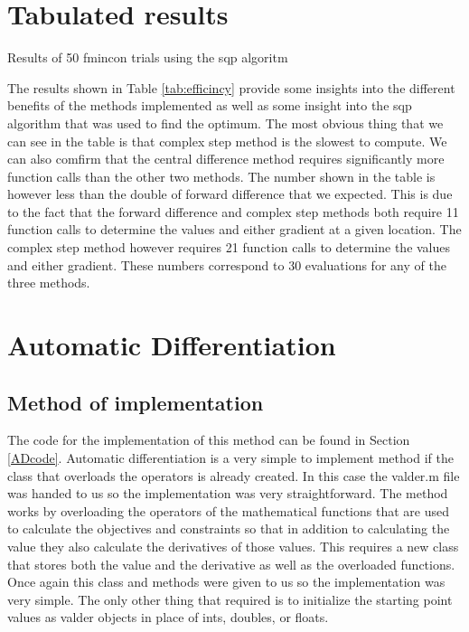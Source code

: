 \documentclass{article}
\begin{document}
\section{Tabulated results}
\begin{table}[H]
	\caption{Results of 50 fmincon trials using the sqp algoritm}
	\label{tab:efficincy}
	\noindent{}
\end{table}

The results shown in Table \ref{tab:efficincy} provide some insights into the
different benefits of the methods implemented as well as some insight into the
sqp algorithm that was used to find the optimum.  The most obvious thing that we
can see in the table is that complex step method is the slowest to compute.  We
can also comfirm that the central difference method requires significantly more
function calls than the other two methods.  The number shown in the table is
however less than the double of forward difference that we expected.  This is
due to the fact that the forward difference and complex step methods both
require 11 function calls to determine the values and either gradient at a given location. The
complex step method however requires 21 function calls to determine the values and either
gradient.  These numbers correspond to 30 evaluations for any of the three
methods.


\section{Automatic Differentiation}
\subsection{Method of implementation}
The code for the implementation of this method can be found in Section \ref{ADcode}.  Automatic differentiation is a very simple to implement method if the class that overloads the operators is already created.  In this case the valder.m file was handed to us so the implementation was very straightforward.  The method works by overloading the operators of the mathematical functions that are used to calculate the objectives and constraints so that in addition to calculating the value they also calculate the derivatives of those values.  This requires a new class that stores both the value and the derivative as well as the overloaded functions.  Once again this class and methods were given to us so the implementation was very simple.  The only other thing that required is to initialize the starting point values as valder objects in place of ints, doubles, or floats.
\end{document}
